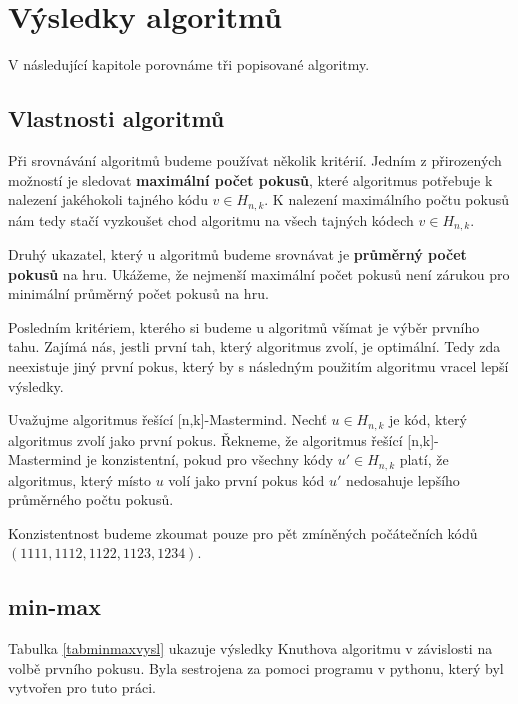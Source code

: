 \chapter{Výsledky algoritmů}
V následující kapitole porovnáme tři popisované algoritmy. 

\section{Vlastnosti algoritmů}
Při srovnávání algoritmů budeme používat několik kritérií. Jedním z přirozených možností je sledovat \textbf{maximální počet pokusů}, které algoritmus potřebuje k nalezení jakéhokoli tajného kódu $v \in H_{n,k}$. K nalezení maximálního počtu pokusů nám tedy stačí vyzkoušet chod algoritmu na všech tajných kódech $v \in H_{n,k}$.

Druhý ukazatel, který u algoritmů budeme srovnávat je \textbf{průměrný počet pokusů} na hru. Ukážeme, že nejmenší maximální počet pokusů není zárukou pro minimální průměrný počet pokusů na hru. 

Posledním kritériem, kterého si budeme u algoritmů všímat je výběr prvního tahu. Zajímá nás, jestli první tah, který algoritmus zvolí, je optimální. Tedy zda neexistuje jiný první pokus, který by s následným použitím algoritmu vracel lepší výsledky. 

\begin{definice}\label{defkonzistentnialg}
    Uvažujme algoritmus řešící [n,k]-Mastermind. Nechť $u \in H_{n,k}$ je kód, který algoritmus zvolí jako první pokus. Řekneme, že algoritmus řešící [n,k]-Mastermind je konzistentní, pokud pro všechny kódy $u' \in H_{n,k}$ platí, že algoritmus, který místo $u$ volí jako první pokus kód $u'$ nedosahuje lepšího průměrného počtu pokusů.
\end{definice}
Konzistentnost budeme zkoumat pouze pro pět zmíněných počátečních kódů $(1111, 1112, 1122, 1123, 1234)$.

\section{min-max}

Tabulka \ref{tabminmaxvysl} ukazuje výsledky Knuthova algoritmu v závislosti na volbě prvního pokusu. Byla sestrojena za pomoci programu v pythonu, který byl vytvořen pro tuto práci. \cite{Simsa_Strategies_for_Mastermind_2025} 


